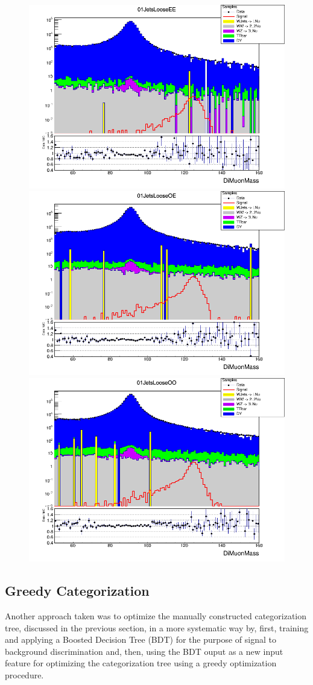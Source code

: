 \begin{figure}[H]
  \centering
  \includegraphics[width=0.65\linewidth]{figures/ch_higgs/distributions/baseline_kalman/distribution__01JetsLooseEE__DiMuonMass__logY.png}\\
  \includegraphics[width=0.65\linewidth]{figures/ch_higgs/distributions/baseline_kalman/distribution__01JetsLooseOE__DiMuonMass__logY.png}\\
  \includegraphics[width=0.65\linewidth]{figures/ch_higgs/distributions/baseline_kalman/distribution__01JetsLooseOO__DiMuonMass__logY.png}
  \caption{}
  \label{fig:higgs_categorization_01jetslooseeeeooo}
\end{figure}

\subsection{Greedy Categorization} \label{bdt_training}
Another approach taken was to optimize the manually constructed categorization tree, discussed in the previous section, in a more systematic way by, first, training and applying a Boosted Decision Tree (BDT) for the purpose of signal to background discrimination and, then, using the BDT ouput as a new input feature for optimizing the categorization tree using a greedy optimization procedure.

